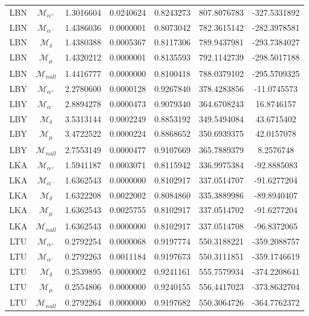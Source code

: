 \begin{tabular}{ccccccc}
LBN & $\mathcal{M}_{\alpha^+}$ & 1.3016604 & 0.0240624 & 0.8243273 & 807.8076783 & -327.5331892\\
LBN & $\mathcal{M}_{\alpha^-}$ & 1.4386036 & 0.0000001 & 0.8073042 & 782.3615142 & -282.3978581\\
LBN & $\mathcal{M}_{\delta}$ & 1.4380388 & 0.0005367 & 0.8117306 & 789.9437981 & -293.7384027\\
LBN & $\mathcal{M}_{\mu}$ & 1.4320212 & 0.0000001 & 0.8135593 & 792.1142739 & -298.5017188\\
LBN & $\mathcal{M}_{null}$ & 1.4416777 & 0.0000000 & 0.8100418 & 788.0379102 & -295.5709325\\
LBY & $\mathcal{M}_{\alpha^+}$ & 2.2780600 & 0.0000128 & 0.9267840 & 378.4283856 & -11.0745573\\
LBY & $\mathcal{M}_{\alpha^-}$ & 2.8894278 & 0.0000473 & 0.9079340 & 364.6708243 & 16.8746157\\
LBY & $\mathcal{M}_{\delta}$ & 3.5313144 & 0.0002249 & 0.8853192 & 349.5494084 & 43.6715402\\
LBY & $\mathcal{M}_{\mu}$ & 3.4722522 & 0.0000224 & 0.8868652 & 350.6939375 & 42.0157078\\
LBY & $\mathcal{M}_{null}$ & 2.7553149 & 0.0000477 & 0.9107669 & 365.7889379 & 8.2576748\\
LKA & $\mathcal{M}_{\alpha^+}$ & 1.5941187 & 0.0003071 & 0.8115942 & 336.9975384 & -92.8885083\\
LKA & $\mathcal{M}_{\alpha^-}$ & 1.6362543 & 0.0000000 & 0.8102917 & 337.0514707 & -91.6277204\\
LKA & $\mathcal{M}_{\delta}$ & 1.6322208 & 0.0022002 & 0.8084860 & 335.3889986 & -89.8940407\\
LKA & $\mathcal{M}_{\mu}$ & 1.6362543 & 0.0025755 & 0.8102917 & 337.0514702 & -91.6277204\\
LKA & $\mathcal{M}_{null}$ & 1.6362543 & 0.0000000 & 0.8102917 & 337.0514708 & -96.8372065\\
LTU & $\mathcal{M}_{\alpha^+}$ & 0.2792254 & 0.0000068 & 0.9197774 & 550.3188221 & -359.2088757\\
LTU & $\mathcal{M}_{\alpha^-}$ & 0.2792263 & 0.0011184 & 0.9197673 & 550.3111851 & -359.1746619\\
LTU & $\mathcal{M}_{\delta}$ & 0.2539895 & 0.0000002 & 0.9241161 & 555.7579934 & -374.2208641\\
LTU & $\mathcal{M}_{\mu}$ & 0.2554806 & 0.0000000 & 0.9240155 & 556.4417023 & -373.8632704\\
LTU & $\mathcal{M}_{null}$ & 0.2792264 & 0.0000000 & 0.9197682 & 550.3064726 & -364.7762372\\

\end{tabular}
